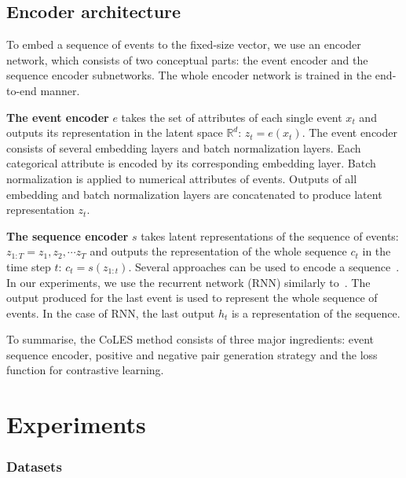 \documentclass[sigconf, anonymous]{acmart}
\newcommand{\R}{\mathbb{R}}
\begin{document}
\subsection{Encoder architecture} \label{sec-enc-arch}

To embed a sequence of events to the fixed-size vector, we use an encoder network, which consists of two conceptual parts: the event encoder and the sequence encoder subnetworks. The whole encoder network is trained in the end-to-end manner.

\textbf{The event encoder} $e$ takes the set of attributes of each single event $x_t$ and outputs its representation in the latent space $\R^d$: $z_t = e(x_t)$. The event encoder consists of several embedding layers and batch normalization layers. Each categorical attribute is encoded by its corresponding embedding layer. Batch normalization is applied to numerical attributes of events. Outputs of all embedding and batch normalization layers are concatenated to produce latent representation $z_t$.

\textbf{The sequence encoder} $s$ takes latent representations of the sequence of events: $ z_{1:T} = z_1, z_2, \cdots z_T $ and outputs the representation of the whole sequence $c_t$ in the time step $t$: $ c_t = s(z_{1:t}) $. Several approaches can be used to encode a sequence~\citep{Cho2014LearningPR, Vaswani2017AttentionIA}. In our experiments, we use the recurrent network (RNN) similarly to~\citep{Sutskever2014SequenceTS}. The output produced for the last event is used to represent the whole sequence of events. In the case of RNN, the last output $h_t$ is a representation of the sequence.

To summarise, the CoLES method consists of three major ingredients: event sequence encoder, positive and negative pair generation strategy and the loss function for contrastive learning.


\section{Experiments} \label{sec-exp}

\subsubsection{Datasets}
\end{document}
